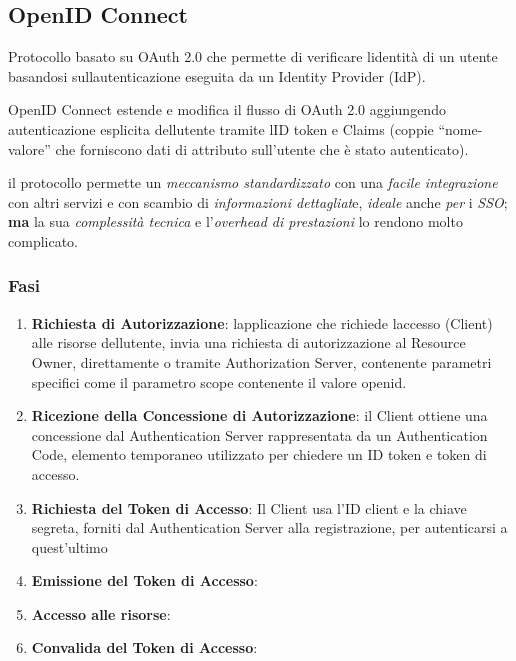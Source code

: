 \subsection{OpenID Connect}\label{openid-connect}

Protocollo basato su OAuth 2.0 che permette di verificare
l\textquotesingle identità di un utente basandosi
sull\textquotesingle autenticazione eseguita da un Identity Provider
(IdP).

OpenID Connect estende e modifica il flusso di OAuth 2.0 aggiungendo
autenticazione esplicita dell\textquotesingle utente tramite
l\textquotesingle ID token e Claims (coppie ``nome-valore'' che
forniscono dati di attributo sull'utente che è stato autenticato).

il protocollo permette un \emph{meccanismo standardizzato} con una
\emph{facile integrazione} con altri servizi e con scambio di
\emph{informazioni dettagliat}e, \emph{ideale} anche \emph{per} i
\emph{SSO}; \textbf{ma} la sua \emph{complessità tecnica} e
l'\emph{overhead di prestazioni} lo rendono molto complicato.

\subsubsection{Fasi}\label{fasi-2}

\begin{enumerate}
\def\labelenumi{\arabic{enumi}.}
\item
  \textbf{Richiesta di Autorizzazione}: l\textquotesingle applicazione
  che richiede l\textquotesingle accesso (Client) alle risorse
  dell\textquotesingle utente, invia una richiesta di autorizzazione al
  Resource Owner, direttamente o tramite Authorization Server,
  contenente parametri specifici come il parametro scope contenente il
  valore openid.
\item
  \textbf{Ricezione della Concessione di Autorizzazione}: il Client
  ottiene una concessione dal Authentication Server rappresentata da un
  Authentication Code, elemento temporaneo utilizzato per chiedere un ID
  token e token di accesso.
\item
  \textbf{Richiesta del Token di Accesso}: Il Client usa l'ID client e
  la chiave segreta, forniti dal Authentication Server alla
  registrazione, per autenticarsi a quest'ultimo
\item
  \textbf{Emissione del Token di Accesso}:
\item
  \textbf{Accesso alle risorse}:
\item
  \textbf{Convalida del Token di Accesso}:
\end{enumerate}

